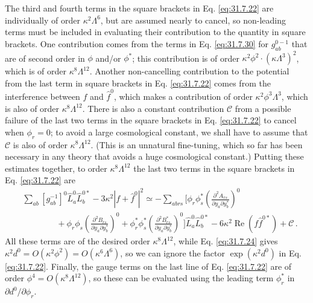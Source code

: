 The third and fourth terms in the square brackets in
Eq. \eqref{eq:31.7.22} are individually of order
\(\kappa^2\Lambda^6\), but are assumed nearly to cancel, so non-leading
terms must be included in evaluating their contribution to the quantity in
square brackets. One contribution comes from the terms in
Eq. \eqref{eq:31.7.30} for \(g_{ab}^{0-1}\) that are of second order in
\(\phi\) and/or \(\phi^*\); this contribution is of order
\(\kappa^2\phi^2\cdot(\kappa\Lambda^3)^2\), which is of order
\(\kappa^8\Lambda^{12}\). Another non-cancelling contribution to the
potential from the last term in square brackets in Eq. \eqref{eq:31.7.22}
comes from the interference between \(f\) and \(\widehat f^0\), which makes
a contribution of order \(\kappa^2\phi^3\Lambda^3\), which is also of order
\(\kappa^8\Lambda^{12}\). There is also a constant contribution
\(\mathcal C\) from a possible failure of the last two terms in the square
brackets in Eq. \eqref{eq:31.7.22} to cancel when \(\phi_r=0\); to avoid a
large cosmological constant, we shall have to assume that \(\mathcal C\) is
also of order \(\kappa^8\Lambda^{12}\). (This is an unnatural fine-tuning,
which so far has been necessary in any theory that avoids a huge
cosmological constant.) Putting these estimates together, to order
\(\kappa^8\Lambda^{12}\) the last two terms in the square brackets in
Eq. \eqref{eq:31.7.22} are
\begin{equation}
  \begin{aligned}
  &\sum_{ab}[g_{ab}^{-1}]^0\widehat L_a^0\widehat L_b^{0*}
  -3\kappa^2|f+\widehat f^0|^2
  \simeq
  -\sum_{abrs}\Biggl[
    \phi_r\phi_s^*
    \left(\frac{\partial^2A_{rs}}
      {\partial y_a\partial y_b^*}\right)^0
  \\
  &\qquad\qquad
  +\phi_r\phi_s
    \left(\frac{\partial^2B_{rs}}
      {\partial y_a\partial y_b^*}\right)^0
  +\phi_r^*\phi_s^*
    \left(\frac{\partial^2B_{rs}^*}
      {\partial y_a\partial y_b^*}\right)^0
  \Biggr]\widehat L_a^0\widehat L_b^{0*}
  -6\kappa^2\operatorname{Re}(f\widehat f^{0*})+\mathcal C\,.
  \end{aligned}
  \tag{31.7.39}\label{eq:31.7.39}
\end{equation}
All these terms are of the desired order \(\kappa^8\Lambda^{12}\), while
Eq. \eqref{eq:31.7.24} gives
\(\kappa^2d^0=O(\kappa^2\phi^2)=O(\kappa^6\Lambda^6)\), so we can ignore the
factor \(\exp(\kappa^2d^0)\) in Eq. \eqref{eq:31.7.22}. Finally, the gauge
terms on the last line of Eq. \eqref{eq:31.7.22} are of order
\(\phi^4=O(\kappa^8\Lambda^{12})\), so these can be evaluated using the
leading term \(\phi_r^*\) in \(\partial d^0/\partial\phi_r\).

